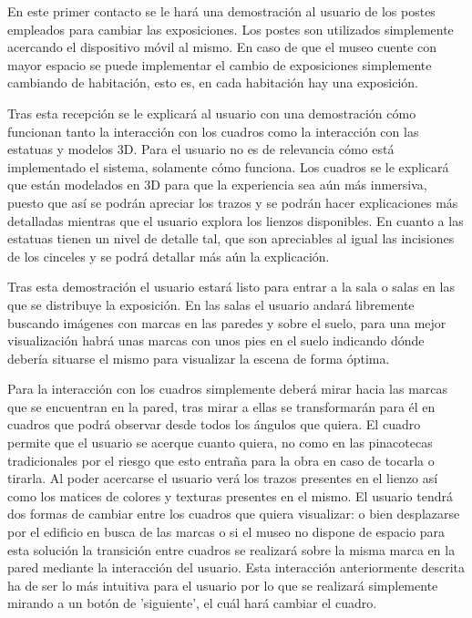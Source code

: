 \documentclass[a4paper,11pt]{article}
\begin{document}
\vspace{10px}

En este primer contacto se le hará una demostración al usuario de los postes empleados para cambiar las exposiciones. Los postes son utilizados simplemente acercando el dispositivo móvil al mismo. En caso de que el museo cuente con mayor espacio se puede implementar el cambio de exposiciones simplemente cambiando de habitación, esto es, en cada habitación hay una exposición.

\vspace{10px}

Tras esta recepción se le explicará al usuario con una demostración cómo funcionan tanto la interacción con los cuadros como la interacción con las estatuas y modelos 3D. Para el usuario no es de relevancia cómo está implementado el sistema, solamente cómo funciona. Los cuadros se le explicará que están modelados en 3D para que la experiencia sea aún más inmersiva, puesto que así se podrán apreciar los trazos y se podrán hacer explicaciones más detalladas mientras que el usuario explora los lienzos disponibles. En cuanto a las estatuas tienen un nivel de detalle tal, que son apreciables al igual las incisiones de los cinceles y se podrá detallar más aún la explicación.

\vspace{10px}

Tras esta demostración el usuario estará listo para entrar a la sala o salas en las que se distribuye la exposición. En las salas el usuario andará libremente buscando imágenes con marcas en las paredes y sobre el suelo, para una mejor visualización habrá unas marcas con unos pies en el suelo indicando dónde debería situarse el mismo para visualizar la escena de forma óptima.

\vspace{10px}

Para la interacción con los cuadros simplemente deberá mirar hacia las marcas que se encuentran en la pared, tras mirar a ellas se transformarán para él en cuadros que podrá observar desde todos los ángulos que quiera. El cuadro permite que el usuario se acerque cuanto quiera, no como en las pinacotecas tradicionales por el riesgo que esto entraña para la obra en caso de tocarla o tirarla. Al poder acercarse el usuario verá los trazos presentes en el lienzo así como los matices de colores y texturas presentes en el mismo. El usuario tendrá dos formas de cambiar entre los cuadros que quiera visualizar: o bien desplazarse por el edificio en busca de las marcas o si el museo no dispone de espacio para esta solución la transición entre cuadros se realizará sobre la misma marca en la pared mediante la interacción del usuario. Esta interacción anteriormente descrita ha de ser lo más intuitiva para el usuario por lo que se realizará simplemente mirando a un botón de 'siguiente', el cuál hará cambiar el cuadro.
\end{document}
